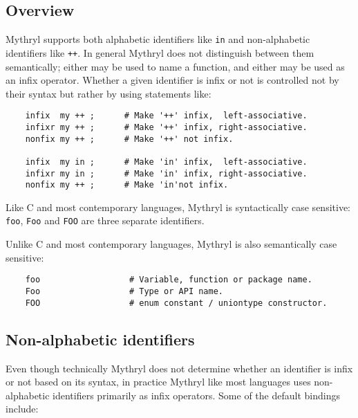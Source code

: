 
\subsection{Overview}
\label{section:ref:identifiers:overview}

Mythryl supports both alphabetic identifiers like {\tt in} and 
non-alphabetic identifiers like {\tt ++}.  In general Mythryl does 
not distinguish between them semantically;  either may be used to 
name a function, and either may be used as an infix operator. 
Whether a given identifier is infix or not is controlled not 
by their syntax but rather by using statements like:

\begin{verbatim}
    infix  my ++ ;      # Make '++' infix,  left-associative.
    infixr my ++ ;      # Make '++' infix, right-associative.
    nonfix my ++ ;      # Make '++' not infix.

    infix  my in ;      # Make 'in' infix,  left-associative.
    infixr my in ;      # Make 'in' infix, right-associative.
    nonfix my ++ ;      # Make 'in'not infix.
\end{verbatim}

Like C and most contemporary languages, Mythryl is syntactically 
case sensitive: {\tt foo}, {\tt Foo} and {\tt FOO} are three 
separate identifiers.

Unlike C and most contemporary languages, Mythryl is also 
semantically case sensitive:

\begin{verbatim}
    foo                  # Variable, function or package name.
    Foo                  # Type or API name.
    FOO                  # enum constant / uniontype constructor.
\end{verbatim}

\cutend*

\subsection{Non-alphabetic identifiers}
\label{section:ref:identifiers:non-alphabetic}

Even though technically Mythryl does not determine 
whether an identifier is infix or not based on its 
syntax, in practice Mythryl like most languages 
uses non-alphabetic identifiers primarily as infix 
operators.  Some of the default bindings include:

